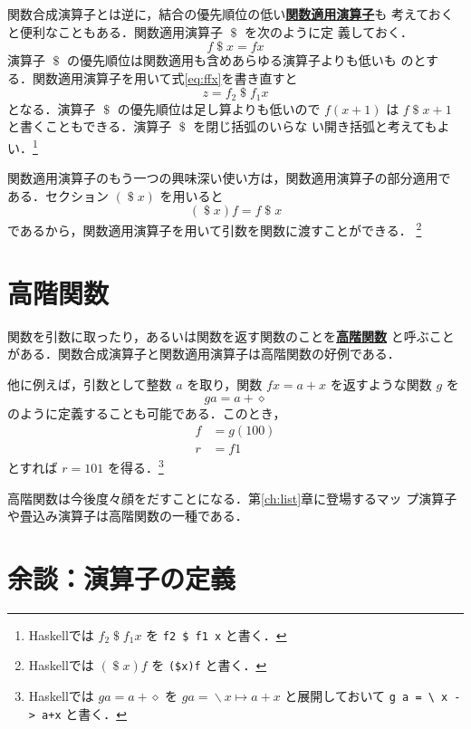 \documentclass[a5paper,twoside,fleqn,draft]{jsbook}
\newcommand{\programminglanguage}[1]{\textsf{#1}}
\newcommand{\haskell}{\programminglanguage{Haskell}}
\newcommand{\keyword}[1]{{\underline{\textbf{#1}}}}
\newcommand{\code}[1]{\texttt{#1}}
\newcommand{\mAnonParam}{\diamond}
\DeclareMathOperator{\mApply}{\$}
\DeclareMathOperator{\mLambda}{\backslash}
\DeclareMathOperator{\mLambdaArrow}{\mapsto}
\newcommand{\mLambdaEXP}[2]{\mLambda{#1}\mLambdaArrow{#2}} %
\begin{document}
関数合成演算子とは逆に，結合の優先順位の低い\keyword{関数適用演算子}も
考えておくと便利なこともある．関数適用演算子 $\mApply$ を次のように定
義しておく．
\begin{equation}
  f\mApply x
  =fx
\end{equation}
演算子 $\mApply$ の優先順位は関数適用も含めあらゆる演算子よりも低いも
のとする．関数適用演算子を用いて式\eqref{eq:ffx}を書き直すと
\begin{equation}
  z
  =f_2\mApply f_1x
\end{equation}
となる．演算子 $\mApply$ の優先順位は足し算よりも低いので $f(x+1)$ は
$f\mApply x+1$ と書くこともできる．演算子 $\mApply$ を閉じ括弧のいらな
い開き括弧と考えてもよい．\footnote{\haskell では $f_2\mApply f_1x$ を
  \code{f2 \$ f1 x} と書く．}

関数適用演算子のもう一つの興味深い使い方は，関数適用演算子の部分適用で
ある．セクション $(\mApply x)$ を用いると
\begin{equation}
  (\mApply x)f
  =f\mApply x
\end{equation}
であるから，関数適用演算子を用いて引数を関数に渡すことができる．
\footnote{\haskell では $(\mApply x)f$ を \code{(\$x)f} と書く．}

\section{高階関数}

関数を引数に取ったり，あるいは関数を返す関数のことを\keyword{高階関数}
と呼ぶことがある．関数合成演算子と関数適用演算子は高階関数の好例である．

他に例えば，引数として整数 $a$ を取り，関数 $fx=a+x$ を返すような関数
$g$ を
\begin{equation}
  ga
  =a+\mAnonParam
\end{equation}
のように定義することも可能である．このとき，
\begin{align}
  f
  &=g(100)\\
  r
  &=f1
\end{align}
とすれば $r=101$ を得る．\footnote{\haskell では $ga=a+\mAnonParam$ を
  $ga=\mLambdaEXP{x}{a+x}$ と展開しておいて \code{g a = \textbackslash
    x -> a+x} と書く．}

高階関数は今後度々顔をだすことになる．第\ref{ch:list}章に登場するマッ
プ演算子や畳込み演算子は高階関数の一種である．

\section{余談：演算子の定義}
\end{document}
